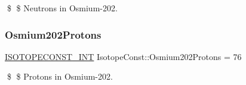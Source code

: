 \$ \$ Neutrons in Osmium-\/202. \mbox{\label{group___isotope_const-_osmium-_os202_ga82ee0d50f3615f4c6d0e653bf374734b}} 
\subsubsection{\texorpdfstring{Osmium202\+Protons}{Osmium202Protons}}
{\footnotesize\ttfamily \mbox{\hyperlink{group___isotope_const-_macros_ga5f18360b3e99483a35c32d789e62621c}{I\+S\+O\+T\+O\+P\+E\+C\+O\+N\+S\+T\+\_\+\+I\+NT}} Isotope\+Const\+::\+Osmium202\+Protons = 76}

\$ \$ Protons in Osmium-\/202. 